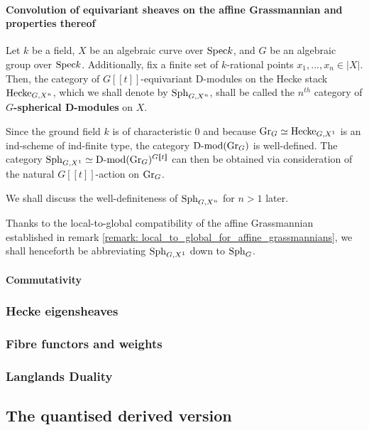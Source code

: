                 \paragraph{Convolution of equivariant sheaves on the affine Grassmannian and properties thereof}
                    \begin{definition} \label{def: spherical_D_modules}
                        Let $k$ be a field, $X$ be an algebraic curve over $\mathrm{Spec} k$, and $G$ be an algebraic group over $\mathrm{Spec} k$. Additionally, fix a finite set of $k$-rational points $x_1, ..., x_n \in |X|$. Then, the category of $G[\![t]\!]$-equivariant D-modules on the Hecke stack $\mathrm{Hecke}_{G, X^n}$, which we shall denote by $\mathrm{Sph}_{G, X^n}$, shall be called the $n^{th}$ category of \textbf{$G$-spherical D-modules} on $X$.
                    \end{definition}
                    \begin{remark}
                        Since the ground field $k$ is of characteristic $0$ and because $\mathrm{Gr}_G \simeq \mathrm{Hecke}_{G, X^1}$ is an ind-scheme of ind-finite type, the category $\mathrm{D}\text{-}\mathrm{mod}(\mathrm{Gr}_G)$ is well-defined. The category $\mathrm{Sph}_{G, X^1} \simeq \mathrm{D}\text{-}\mathrm{mod}(\mathrm{Gr}_G)^{G[\![t]\!]}$ can then be obtained via consideration of the natural $G[\![t]\!]$-action on $\mathrm{Gr}_G$. 
                                
                        We shall discuss the well-definiteness of $\mathrm{Sph}_{G, X^n}$ for $n > 1$ later.
                    \end{remark}
                    \begin{convention}
                        Thanks to the local-to-global compatibility of the affine Grassmannian established in remark \ref{remark: local_to_global_for_affine_grassmannians}, we shall henceforth be abbreviating $\mathrm{Sph}_{G, X^1}$ down to $\mathrm{Sph}_G$.
                    \end{convention}
                    
                \paragraph{Commutativity}
            
            \subsubsection{Hecke eigensheaves}
            
            \subsubsection{Fibre functors and weights}
            
            \subsubsection{Langlands Duality}
            
        \subsection{The quantised derived version}